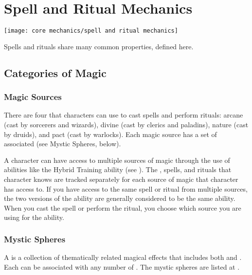 \section{Spell and Ritual Mechanics}\label{Spell and Ritual Mechanics}
    \texttt{[image: core mechanics/spell and ritual mechanics]}

    Spells and rituals share many common properties, defined here.

    \subsection{Categories of Magic}

    \subsubsection{Magic Sources}
        There are four  that characters can use to cast spells and perform rituals: arcane (cast by sorcerers and wizards), divine (cast by clerics and paladins), nature (cast by druids), and pact (cast by warlocks).
        Each magic source has a set of associated  (see Mystic Spheres, below).

            A character can have access to multiple sources of magic through the use of abilities like the Hybrid Training ability (see ).
            The , spells, and rituals that character knows are tracked separately for each source of magic that character has access to.
            If you have access to the same spell or ritual from multiple sources, the two versions of the ability are generally considered to be the same ability.
            When you cast the spell or perform the ritual, you choose which source you are using for the ability.

        \subsubsection{Mystic Spheres}
            A  is a collection of thematically related magical effects that includes both  and .
            Each  can be associated with any number of .
            The mystic spheres are listed at .


